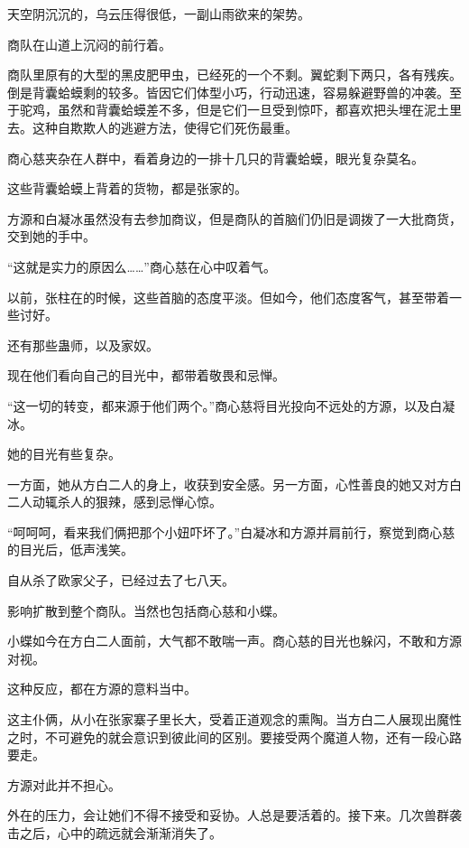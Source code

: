 
\begin{this_body}



天空阴沉沉的，乌云压得很低，一副山雨欲来的架势。

商队在山道上沉闷的前行着。

商队里原有的大型的黑皮肥甲虫，已经死的一个不剩。翼蛇剩下两只，各有残疾。倒是背囊蛤蟆剩的较多。皆因它们体型小巧，行动迅速，容易躲避野兽的冲袭。至于驼鸡，虽然和背囊蛤蟆差不多，但是它们一旦受到惊吓，都喜欢把头埋在泥土里去。这种自欺欺人的逃避方法，使得它们死伤最重。

商心慈夹杂在人群中，看着身边的一排十几只的背囊蛤蟆，眼光复杂莫名。

这些背囊蛤蟆上背着的货物，都是张家的。

方源和白凝冰虽然没有去参加商议，但是商队的首脑们仍旧是调拨了一大批商货，交到她的手中。

“这就是实力的原因么……”商心慈在心中叹着气。

以前，张柱在的时候，这些首脑的态度平淡。但如今，他们态度客气，甚至带着一些讨好。

还有那些蛊师，以及家奴。

现在他们看向自己的目光中，都带着敬畏和忌惮。

“这一切的转变，都来源于他们两个。”商心慈将目光投向不远处的方源，以及白凝冰。

她的目光有些复杂。

一方面，她从方白二人的身上，收获到安全感。另一方面，心性善良的她又对方白二人动辄杀人的狠辣，感到忌惮心惊。

“呵呵呵，看来我们俩把那个小妞吓坏了。”白凝冰和方源并肩前行，察觉到商心慈的目光后，低声浅笑。

自从杀了欧家父子，已经过去了七八天。

影响扩散到整个商队。当然也包括商心慈和小蝶。

小蝶如今在方白二人面前，大气都不敢喘一声。商心慈的目光也躲闪，不敢和方源对视。

这种反应，都在方源的意料当中。

这主仆俩，从小在张家寨子里长大，受着正道观念的熏陶。当方白二人展现出魔性之时，不可避免的就会意识到彼此间的区别。要接受两个魔道人物，还有一段心路要走。

方源对此并不担心。

外在的压力，会让她们不得不接受和妥协。人总是要活着的。接下来。几次兽群袭击之后，心中的疏远就会渐渐消失了。


\end{this_body}
